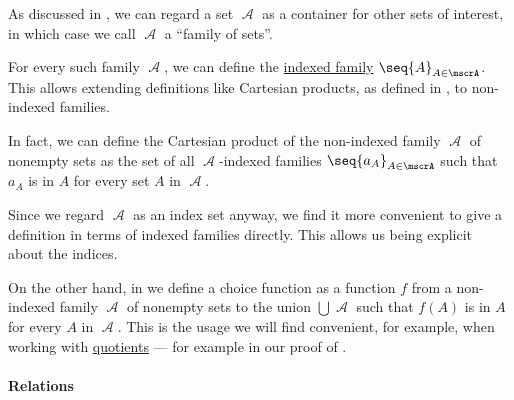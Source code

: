 \begin{remark}\label{rem:family_to_indexed_family}
  As discussed in , we can regard a set \( \mscrA \) as a container for other sets of interest, in which case we call \( \mscrA \) a \enquote{family of sets}.

  For every such family \( \mscrA \), we can define the \hyperref[def:indexed_family]{indexed family} \( \seq{ A }_{A \in \mscrA} \). This allows extending definitions like Cartesian products, as defined in , to non-indexed families.

  In fact, we can define the Cartesian product of the non-indexed family \( \mscrA \) of nonempty sets as the set of all \( \mscrA \)-indexed families \( \seq{ a_A }_{A \in \mscrA} \) such that \( a_A \) is in \( A \) for every set \( A \) in \( \mscrA \).

  Since we regard \( \mscrA \) as an index set anyway, we find it more convenient to give a definition in terms of indexed families directly. This allows us being explicit about the indices.

  On the other hand, in  we define a choice function as a function \( f \) from a non-indexed family \( \mscrA \) of nonempty sets to the union \( \bigcup \mscrA \) such that \( f(A) \) is in \( A \) for every \( A \) in \( \mscrA \). This is the usage we will find convenient, for example, when working with \hyperref[def:equivalence_relation/quotient]{quotients} --- for example in our proof of .
\end{remark}

\paragraph{Relations}

